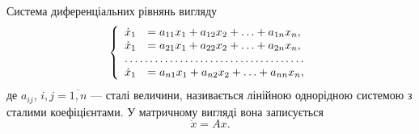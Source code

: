 Система диференціальних рівнянь вигляду
\begin{equation*}
	\left\{
		\begin{array}{rl}
			\dot x_1 &= a_{11} x_1 + a_{12} x_2 + \ldots + a_{1n} x_n, \\
			\dot x_1 &= a_{21} x_1 + a_{22} x_2 + \ldots + a_{2n} x_n, \\
			\hdotsfor{2} \\
			\dot x_1 &= a_{n1} x_1 + a_{n2} x_2 + \ldots + a_{nn} x_n,
		\end{array}
	\right.
\end{equation*}
де $a_{ij}$, $i,j = \overline{1, n}$ --- сталі величини, називається лінійною однорідною системою з сталими коефіцієнтами. У матричному вигляді вона записується
\begin{equation*}
	\dot x = A x.
\end{equation*}
